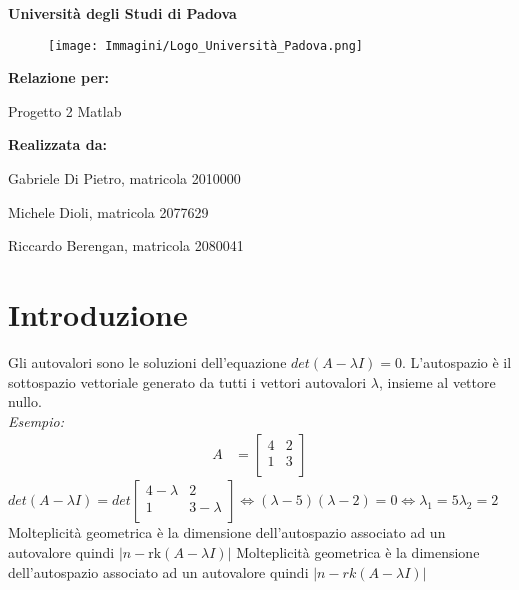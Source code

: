 \documentclass[12pt]{article}
\newcommand{\abs}[1]{\left|#1\right|}
\renewcommand{\familydefault}{\rmdefault} %
\begin{document}
\begin{titlepage}
    \centering
    {\Huge \textbf{Università degli Studi di Padova} \par}
    \vspace{1cm}
    \begin{figure}[h!]
        \centering
        \texttt{[image: Immagini/Logo\_Università\_Padova.png]}
    \end{figure}
    \vspace{1.5cm}
    {\LARGE \textbf{Relazione per:} \par}
    {\Huge Progetto 2 Matlab \par}
    \vfill
    \textbf{Realizzata da:} \par
    Gabriele Di Pietro, matricola 2010000 \par
    Michele Dioli, matricola 2077629 \par
    Riccardo Berengan, matricola 2080041 \par
    \vspace{0.5cm}
\end{titlepage}
    \renewcommand{\familydefault}{\sfdefault} %
    \fontsize{10}{12}\selectfont
    \newpage
    \section{Introduzione}
    Gli autovalori sono le soluzioni dell'equazione $det(A-\lambda I) = 0$. 
    L'autospazio è il sottospazio vettoriale generato da tutti i vettori autovalori $\lambda$, insieme al vettore nullo.\\ \textit{Esempio:}
    \begin{align*}
        A &= \begin{bmatrix}
            4 & 2 \\
            1 & 3 \\
        \end{bmatrix}
    \end{align*}
    $det(A-\lambda I) = det\begin{bmatrix}
        4-\lambda & 2 \\
        1 & 3-\lambda \\
    \end{bmatrix} \iff (\lambda - 5)(\lambda-2) = 0 \iff \lambda_1 = 5 \lambda_2 = 2$\\
    Molteplicità geometrica è la dimensione dell'autospazio associato ad un autovalore quindi $\abs{n - \text{rk}(A - \lambda I)}$
    Molteplicità geometrica è la dimensione dell'autospazio associato ad un autovalore quindi $|n - rk(A - \lambda I)|$
\end{document}
